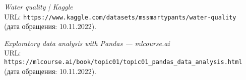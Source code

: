  
\begin{thebibliography}{99}
{\itshape Water quality | Kaggle}\\
URL: \texttt{https://www.kaggle.com/datasets/mssmartypants/water-quality}\\
(дата обращения: 10.11.2022).

{\itshape Exploratory data analysis with Pandas --- mlcourse.ai}\\
URL: \texttt{https://mlcourse.ai/book/topic01/topic01\_pandas\_data\_analysis.html}\\
(дата обращения: 10.11.2022).

\end{thebibliography}
\pagebreak
